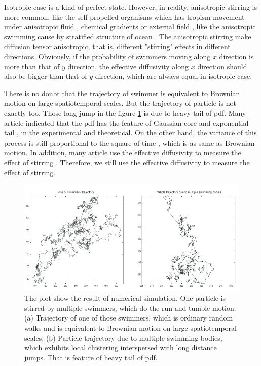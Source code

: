 \documentclass[12pt,a4paper]{article}
\begin{document}
Isotropic case is a kind of perfect state. However, in reality,
anisotropic stirring is more common, like the self-propelled organisms
which has tropism movement under anisotropic fluid \cite{Bacterial},
chemical gradients \cite{Concentration} or external field
\cite{Enhance, SwimStress}, like the anisotropic swimming cause by
stratified structure of ocean \cite{BiogenicInputs}. The anisotropic
stirring make diffusion tensor anisotropic, that is, different
"stirring" effects in different directions. Obviously, if the
probability of swimmers moving along $x$ direction is more than that
of $y$ direction, the effective diffusivity along $x$ direction should
also be bigger than that of $y$ direction, which are always equal in
isotropic case.

There is no doubt that the trajectory of swimmer is equivalent to
Brownian motion on large spatiotemporal scales. But the trajectory of
particle is not exactly too. Those long jump in the figure \ref{fig:1} is due to
heavy tail of pdf. Many article indicated that the pdf has the feature
of Gaussian core and exponential tail \cite{Distribution, Dynamics},
in the experimental and theoretical. On the other hand, the variance
of this process is still proportional to the square of time
\cite{ParticleDiffusion}, which is as same as Brownian motion. In
addition, many article use the effective diffusivity to measure the
effect of stirring \cite{Stirr, DiffusionColloidal}. Therefore, we
still use the effective diffusivity to measure the effect of stirring.

\begin{figure}
  \centering
  \includegraphics[scale=0.9]{figure1}
  \caption{The plot show the result of numerical simulation. One
    particle is stirred by multiple swimmers, which do the
    run-and-tumble motion. (a) Trajectory of one of those swimmers,
    which is ordinary random walks and is equivalent to Brownian
    motion on large spatiotemporal scales. (b) Particle trajectory due
    to multiple swimming bodies, which exhibits local clustering
    interspersed with long distance jumps. That is feature of heavy tail
    of pdf.}
  \label{fig:1}
\end{figure}
\end{document}
